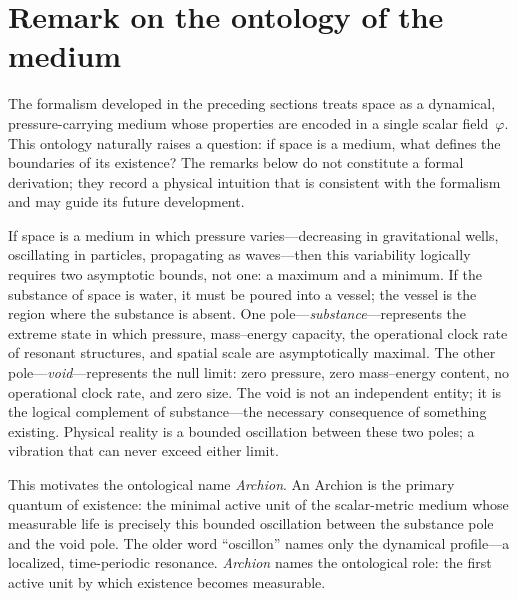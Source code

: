 \documentclass[aps,prd,onecolumn,superscriptaddress,nofootinbib,showpacs,12pt,notitlepage]{revtex4-2}
\begin{document}
\section{Remark on the ontology of the medium}\label{sec:ontology}

The formalism developed in the preceding sections treats space
as a dynamical, pressure-carrying medium whose properties are
encoded in a single scalar field~$\varphi$.  This ontology
naturally raises a question: if space is a medium, what defines
the boundaries of its existence?  The remarks below do not
constitute a formal derivation; they record a physical intuition
that is consistent with the formalism and may guide its future
development.

If space is a medium in which pressure varies---decreasing in
gravitational wells, oscillating in particles, propagating as
waves---then this variability logically requires two asymptotic
bounds, not one: a maximum and a minimum.  If the substance of
space is water, it must be poured into a vessel; the vessel is
the region where the substance is absent.  One pole---\emph{substance}---represents
the extreme state in which pressure, mass--energy capacity, the
operational clock rate of resonant structures, and spatial scale
are asymptotically maximal.  The other pole---\emph{void}---represents
the null limit: zero pressure, zero mass--energy content, no
operational clock rate, and zero size.  The void is not an
independent entity; it is the logical complement of
substance---the necessary consequence of something existing.
Physical reality is a bounded oscillation between these two
poles; a vibration that can never exceed either limit.

This motivates the ontological name \emph{Archion}.  An Archion
is the primary quantum of existence: the minimal active unit of
the scalar-metric medium whose measurable life is precisely this
bounded oscillation between the substance pole and the void pole.
The older word ``oscillon'' names only the dynamical profile---a
localized, time-periodic resonance.  \emph{Archion} names the
ontological role: the first active unit by which existence becomes
measurable.
\end{document}
